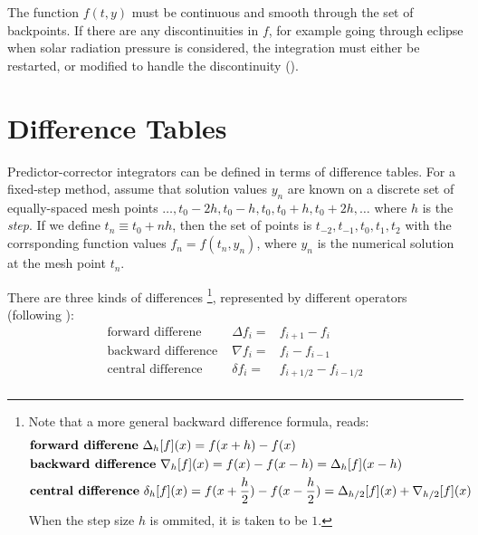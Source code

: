 The function \( f(t,y) \) must be continuous and smooth through the set of 
backpoints. If there are any discontinuities in \( f \), for example going through eclipse when 
solar radiation pressure is considered, the integration must either be restarted, or 
modified to handle the discontinuity (\cite{berry2004}).

\section{Difference Tables}
Predictor-corrector integrators can be defined in terms of difference tables. 
For a fixed-step method, assume that solution values \( y_n \) are known on a 
discrete set of equally-spaced mesh points 
\( \ldots, t_0 - 2h , t_0 - h , t_0 , t_0 + h , t_0 + 2h , \ldots \)
where \( h \) is the \emph{step}. If we define \(  t_n \equiv t_0 + n h \), then the 
set of points is \( t_{-2}, t_{-1}, t_0 , t_{1}, t_{2} \) with the corrsponding 
function values \( f_n = f(t_n , y_n ) \), where \( y_n \) is the numerical solution 
at the mesh point \( t_n \).

There are three kinds of differences \footnote{Note that a more general backward difference formula, 
reads:
\begin{equation}
  \begin{aligned}
    & \text{\textbf{forward differene} } {\Delta}_h [f](x) = f(x+h) - f(x)\\  
    & \text{\textbf{backward difference} } {\nabla}_h [f](x) = f(x) - f(x-h) = {\Delta}_h [f](x-h)\\
    & \text{\textbf{central difference} } {\delta}_h [f](x) = f(x+\frac{h}{2}) - f(x-\frac{h}{2}) = {\Delta}_{h/2} [f](x) + {\nabla}_{h/2} [f](x)\\
  \end{aligned}
\end{equation}
When the step size \( h \) is ommited, it is taken to be \(1\). }, 
represented by different operators (following \cite{berry2004}):
\begin{equation}
  \begin{aligned}
    \text{forward differene     } &   \Delta f_i    = & f_{i+1} - f_i \\
    \text{backward difference    } & \nabla f_i  = & f_i - f_{i-1} \\
    \text{central difference    } &   \delta f_i   = & f_{i+1/2} - f_{i-1/2} \\
  \end{aligned}
\end{equation}

